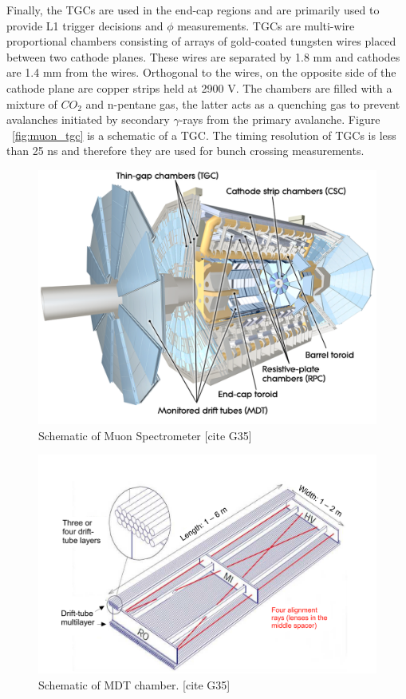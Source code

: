 Finally, the TGCs are used in the end-cap regions and are primarily used to provide L1 trigger decisions and $\phi$ measurements. TGCs are multi-wire proportional chambers consisting of arrays of gold-coated tungsten wires placed between two cathode planes. These wires are separated by 1.8 mm and cathodes are 1.4 mm from the wires. Orthogonal to the wires, on the opposite side of the cathode plane are copper strips held at 2900 V. The chambers are filled with a mixture of $CO_{2}$ and n-pentane gas, the latter acts as a quenching gas to prevent avalanches initiated by secondary $\gamma$-rays from the primary avalanche. Figure ~\ref{fig:muon_tgc} is a schematic of a TGC. The timing resolution of TGCs is less than 25 ns and therefore they are used for bunch crossing measurements. 

\begin{figure}[h!]
  \centering
  \includegraphics[width=\hsize]{figures/Detector/muonsys.pdf}
  \caption{Schematic of Muon Spectrometer [cite G35]} 
  \label{fig:muonsys}
\end{figure}
\FloatBarrier


\begin{figure}[h!]
  \centering
  \includegraphics[width=\hsize]{figures/Detector/muon_mdt.pdf}
  \caption{Schematic of MDT chamber. [cite G35]} 
  \label{fig:muon_mdt}
\end{figure}
\FloatBarrier


